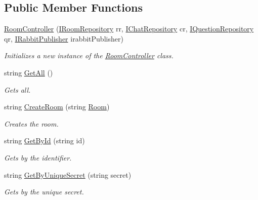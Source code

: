 \subsection*{Public Member Functions}
\begin{DoxyCompactItemize}
\item 
\hyperlink{class_wis_r_rest_a_p_i_1_1_controllers_1_1_room_controller_ac8968b0858aec120f53d7b128e80262e}{Room\+Controller} (\hyperlink{interface_wis_r_rest_a_p_i_1_1_domain_model_1_1_i_room_repository}{I\+Room\+Repository} rr, \hyperlink{interface_wis_r_rest_a_p_i_1_1_providers_1_1_i_chat_repository}{I\+Chat\+Repository} cr, \hyperlink{interface_wis_r_rest_a_p_i_1_1_domain_model_1_1_i_question_repository}{I\+Question\+Repository} qr, \hyperlink{interface_wis_r_rest_a_p_i_1_1_providers_1_1_i_rabbit_publisher}{I\+Rabbit\+Publisher} irabbit\+Publisher)
\begin{DoxyCompactList}\small\item\em Initializes a new instance of the \hyperlink{class_wis_r_rest_a_p_i_1_1_controllers_1_1_room_controller}{Room\+Controller} class. \end{DoxyCompactList}\item 
string \hyperlink{class_wis_r_rest_a_p_i_1_1_controllers_1_1_room_controller_accefc672156db932f258f2ce3b215945}{Get\+All} ()
\begin{DoxyCompactList}\small\item\em Gets all. \end{DoxyCompactList}\item 
string \hyperlink{class_wis_r_rest_a_p_i_1_1_controllers_1_1_room_controller_ad3ab8b1c3c69ccd1233fb0e4ccd2a8f9}{Create\+Room} (string \hyperlink{class_wis_r_1_1_domain_models_1_1_room}{Room})
\begin{DoxyCompactList}\small\item\em Creates the room. \end{DoxyCompactList}\item 
string \hyperlink{class_wis_r_rest_a_p_i_1_1_controllers_1_1_room_controller_ab8438fba187cc10fb023f9318458f41f}{Get\+By\+Id} (string id)
\begin{DoxyCompactList}\small\item\em Gets by the identifier. \end{DoxyCompactList}\item 
string \hyperlink{class_wis_r_rest_a_p_i_1_1_controllers_1_1_room_controller_afbe7421d52f132df05d4d4832755cf56}{Get\+By\+Unique\+Secret} (string secret)
\begin{DoxyCompactList}\small\item\em Gets by the unique secret. \end{DoxyCompactList}\item 

\end{DoxyCompactItemize}
